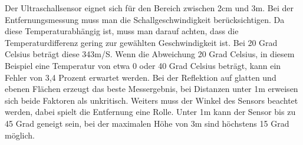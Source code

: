   Der Ultraschallsensor eignet sich für den Bereich zwischen 2cm und 3m. Bei der Entfernungsmessung muss man die Schallgeschwindigkeit berücksichtigen. Da diese Temperaturabhängig ist, muss man darauf achten, dass die Temperaturdifferenz gering zur gewählten Geschwindigkeit ist. Bei 20 Grad Celsius beträgt diese 343m/S. Wenn die Abweichung 20 Grad Celsius, in diesem Beispiel eine Temperatur von etwa 0 oder 40 Grad Celsius beträgt, kann ein Fehler von 3,4 Prozent erwartet werden.
  Bei der Reflektion auf glatten und ebenen Flächen erzeugt das beste Messergebnis, bei Distanzen unter 1m erweisen sich beide Faktoren als unkritisch.
  Weiters muss der Winkel des Sensors beachtet werden, dabei spielt die Entfernung eine Rolle. Unter 1m kann der Sensor bis zu 45 Grad geneigt sein, bei der maximalen Höhe von 3m sind höchstens 15 Grad möglich. \cite{Ultrasonic}
